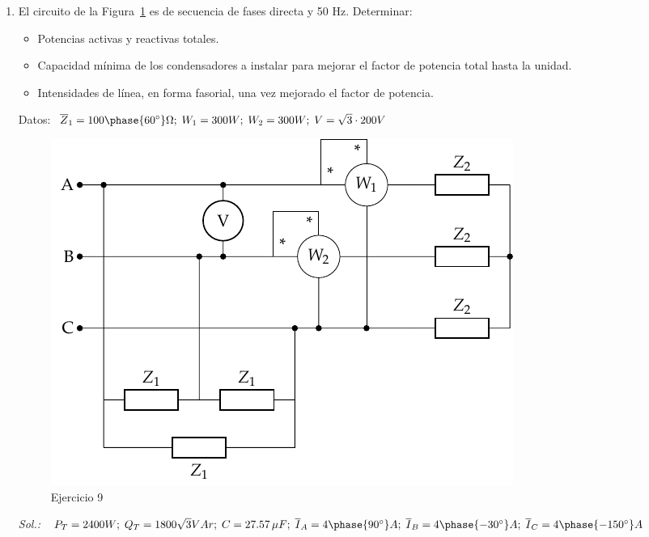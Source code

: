 \begin{enumerate}
\begin{itemize}
\begin{itemize}
    \item Calcular el {valor eficaz} de la corriente de línea total.
    \item Calcular el triángulo de potencias a la entrada de la línea.
    \item Calcular el {valor eficaz} de la tensión a la entrada de la
      línea.
    \item Determinar la lectura de los vatímetros descritos
      anteriormente.
    \end{itemize}
  \end{itemize}
  \emph{Sol.:
    $P_1 = {30}{kW};\; Q_1 = {24.07}{kVAr};\; S_1={38.46}{kVA};\; P_2
    = {7.5}{kW};\; Q_2 = {8.31}{kVAr};\; S_2 ={11.19}{kVA}; P_T=
    {37.5}{kW}; \;Q_T= {32.38}{kVAr};\; S_T = {49.55}{kVA};\; I_1 =
    {55.51}{A};\; I_2 = {16.15}{A};\; I_T= {71.52}{A};\; W_{A,AC} =
    {28.10}{kW}; \; W_{B,BC} = {9.40}{kW};\;W_{C, BA} =-
    {18.69}{kW};\; P_g = {39.74}{kW};\; Q_g= {32.38}{kVAr};\; S_g =
    {51.26}{kVA};\;U_g = {413.81}{V};\; C = {214.7}{\mu F/fase};\;
    I_T' = {54.13}{A};\; P_g' = {38.78}{kW};\; Q_g' = {0}{VAr};\; S_g'
    ={38.78}{kVA};\; U' = {413.66}{V};\; W_{A,AC}' = {18.75}{kW};\;
    W_{B,BC}' = {18.75}{kW};\; W'_{C,BA} = {0}{W}$ }
 
\item El circuito de la Figura~\ref{fig.ej9_BT3} es de secuencia de
  fases directa y 50 Hz. Determinar:
  \begin{itemize}
  \item Potencias activas y reactivas totales.
  \item Capacidad mínima de los condensadores a instalar para mejorar
    el factor de potencia total hasta la unidad.
  \item Intensidades de línea, en forma fasorial, una vez mejorado el
    factor de potencia.
  \end{itemize}
  Datos:
  $\overline{Z}_1 = {100\phase{{60}^\circ}}{\Omega};\; W_1 =
  {300}{W};\; W_2 = {300}{W};\; V= {\sqrt{3} \cdot 200}{V}$
  \begin{figure}[H]
    \centering
    \includegraphics[width=0.5\linewidth]{../figs/ej9_BT3.pdf}
    \caption{Ejercicio 9}
    \label{fig.ej9_BT3}
  \end{figure}
  \emph{Sol.:
    $P_T = {2400} W;\; Q_T =1800\sqrt{3}{VAr};\; C=27.57\,\mu
    F;\;\overline{I}_A = {4\phase{{90^\circ}}}{A}; \;
    \overline{I}_B={4\phase{{-30^\circ}}}{A};\; \overline{I}_C
    ={4\phase{{-150^\circ}}}{A}$}

\end{enumerate}
